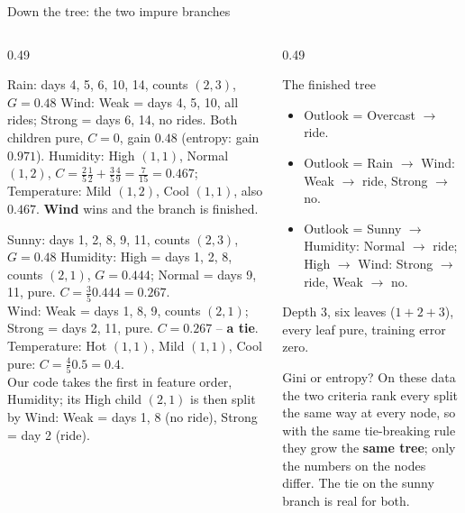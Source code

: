 \documentclass[10pt,aspectratio=169]{beamer}
\begin{document}
\begin{frame}{Down the tree: the two impure branches}
\footnotesize
\begin{columns}[T]
\begin{column}{0.49\textwidth}
\begin{block}{Rain: days 4, 5, 6, 10, 14, counts $(2,3)$, $G=0.48$}
Wind: Weak = days 4, 5, 10, all rides; Strong = days 6, 14, no rides.  Both
children pure, $C=0$, gain $0.48$ (entropy: gain $0.971$).  Humidity: High
$(1,1)$, Normal $(1,2)$, $C=\tfrac25\tfrac12+\tfrac35\tfrac49=\tfrac7{15}=0.467$;
Temperature: Mild $(1,2)$, Cool $(1,1)$, also $0.467$.  \textbf{Wind} wins
and the branch is finished.
\end{block}
\begin{block}{Sunny: days 1, 2, 8, 9, 11, counts $(2,3)$, $G=0.48$}
Humidity: High = days 1, 2, 8, counts $(2,1)$, $G=0.444$; Normal = days 9,
11, pure.  $C=\tfrac{3}{5}0.444=0.267$.\\
Wind: Weak = days 1, 8, 9, counts $(2,1)$; Strong = days 2, 11, pure.
$C=0.267$ -- \textbf{a tie}.\\
Temperature: Hot $(1,1)$, Mild $(1,1)$, Cool pure: $C=\tfrac{4}{5}0.5=0.4$.\\
Our code takes the first in feature order, Humidity; its High child
$(2,1)$ is then split by Wind: Weak = days 1, 8 (no ride), Strong = day 2
(ride).
\end{block}
\end{column}
\begin{column}{0.49\textwidth}
\begin{block}{The finished tree}
\begin{itemize}
  \item Outlook = Overcast $\to$ ride.
  \item Outlook = Rain $\to$ Wind: Weak $\to$ ride, Strong $\to$ no.
  \item Outlook = Sunny $\to$ Humidity: Normal $\to$ ride; High $\to$
        Wind: Strong $\to$ ride, Weak $\to$ no.
\end{itemize}
Depth 3, six leaves ($1+2+3$), every leaf pure, training error zero.
\end{block}
\begin{block}{Gini or entropy?}
On these data the two criteria rank every split the same way at every node,
so with the same tie-breaking rule they grow the \textbf{same tree}; only
the numbers on the nodes differ.  The tie on the sunny branch is real for
both.
\end{block}
\end{column}
\end{columns}
\end{frame}
\end{document}
